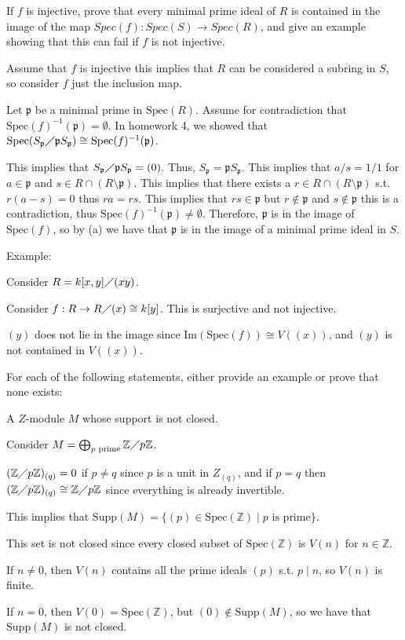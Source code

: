 \documentclass[12pt, letterpaper]{article}
\newcommand{\Z}{\mathbb{Z}}
\newcommand{\p}{\mathfrak{p}}
\renewcommand{\t}[1]{\text{#1}}
\newcommand{\Spec}{\mathrm{Spec}}
\newcommand{\Supp}{\mathrm{Supp}}
\begin{document}
\begin{subproblem}{}
    If $f$ is injective, prove that every minimal prime ideal of $R$ is contained in the image
of the map $Spec(f ) : Spec(S) \to Spec(R)$, and give an example showing that this can
fail if $f$ is not injective.
\end{subproblem}
\begin{problemproof}
    Assume that $f$ is injective this implies that $R$ can be considered a subring in $S$, so consider $f$ just the inclusion map.

    Let $\p$ be a minimal prime in $\Spec(R)$. Assume for contradiction that $\Spec(f)^{-1}(\p) = \emptyset$. In homework 4, we showed that $\Spec(S_\p \diagup \p S_\p) \cong \Spec(f)^{-1}(\p)$.

    This implies that $S_\p \diagup \p S_\p = (0)$. Thus, $S_\p = \p S_\p$. This implies that $a/s = 1/1$ for $a \in \p$ and $s \in R \cap (R \setminus \p)$. This implies that there exists a $r \in R \cap ( R \setminus \p)$ s.t.
    $r(a-s)=0$ thus $ra=rs$. This implies that $rs \in \p$ but $r \notin \p$ and $s \notin \p$ this is a contradiction, thus $\Spec(f)^{-1}(\p) \neq \emptyset$. Therefore, $\p$ is in the image of $\Spec(f)$, so by (a) we have that $\p$ is in the image of a minimal prime ideal in $S$.

    Example:

    Consider $R = k[x,y] \diagup (xy)$.

    Consider $f : R \to R \diagup (x) \cong k[y]$. This is surjective and not injective.

    $(y)$ does not lie in the image since $\mathrm{Im}(\Spec(f)) \cong V((x))$, and $(y)$ is not contained in $V((x))$.
\end{problemproof}

\begin{problem}{}
    For each of the following statements, either provide an example or prove that none exists:
\end{problem}

\begin{subproblem}{}
    A $Z$-module $M$ whose support is not closed.
\end{subproblem}
\begin{problemproof}
    Consider $M=\bigoplus_{p \t{ prime}} \Z \diagup p\Z$.

    $(\Z \diagup p \Z)_{(q)} = 0$ if $p\neq q$ since $p$ is a unit in $Z_{(q)}$, and if $p=q$ then $(\Z \diagup p \Z)_{(q)} \cong \Z \diagup p \Z$ since everything is already invertible.

    This implies that $\Supp(M)=\{(p) \in \Spec(\Z) \mid \t{$p$ is prime}\}$.

    This set is not closed since every closed subset of $\Spec(\Z)$ is $V(n)$ for $n \in \Z$.

    If $n \neq 0$, then $V(n)$ contains all the prime ideals $(p)$ s.t. $p \mid n$, so $V(n)$ is finite.

    If $n = 0$, then $V(0)= \Spec(\Z)$, but $(0) \notin \Supp(M)$, so we have that $\Supp(M)$ is not closed.
\end{problemproof}
\end{document}
